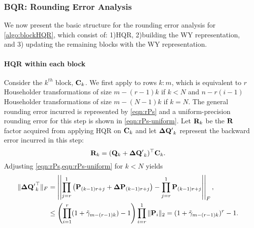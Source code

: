 \subsubsection{BQR: Rounding Error Analysis}
We now present the basic structure for the rounding error analysis for \cref{algo:blockHQR}, which consist of: 1)HQR, 2)building the WY representation, and 3) updating the remaining blocks with the WY representation.
\paragraph{HQR within each block}
Consider the $k^{th}$ block, $\mathbf{C}_k$. 
We first apply  to rows $k:m$, which is equivalent to $r$ Householder transformations of size $m-(r-1)k$ if $k < N$ and $n-r(i-1)$ Householder transformations of size $m-(N-1)k$ if $k=N$. 
The general rounding error incurred is represented by \cref{eqn:rPs} and a uniform-precision rounding error for this step is shown in \cref{eqn:rPs-uniform}.
Let $\mathbf{R}_k$ be the $\mathbf{R}$ factor acquired from applying HQR on $\mathbf{C}_k$ and let $\mathbf{\Delta Q'}_k$ represent the backward error incurred in this step:
\begin{equation*}
	\mathbf{R}_k = (\mathbf{Q}_k+\mathbf{\Delta Q'}_k)^{\top}\mathbf{C}_k.
\end{equation*}
Adjusting \cref{eqn:rPs,eqn:rPs-uniform} for $k<N$ yields
\begin{align}
\|\bb{\Delta Q'}_k^{\top}\|_F &= \left|\left| \prod_{j=r}^{1}\left(\bb{P}_{(k-1)r+j} +\bb{\Delta P}_{(k-1)r+j}\right) - \prod_{j=r}^{1}\bb{P}_{(k-1)r+j} \right|\right|_F,\label{eqn:rPs-BQR}\\
&\leq \left(\prod_{i=1}^r(1+\tilde{\gamma}_{m-(r-1)k})-1\right)\prod_{i=r}^1\|\bb{P}_i\|_2 = (1+\tilde{\gamma}_{m-(r-1)k})^r-1. \label{eqn:rPs-BQR-uniform}
\end{align}
